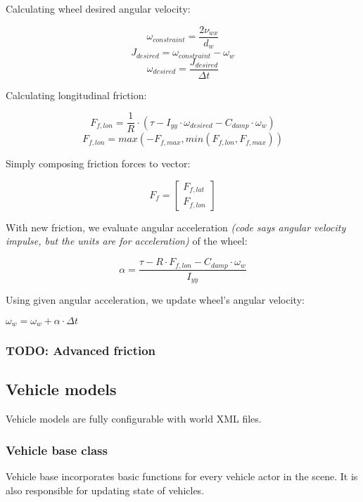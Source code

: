 \documentclass[a4paper,11pt]{article}
\begin{document}
Calculating wheel desired angular velocity:

\begin{center}
\[
\omega_{constraint} = \frac{2\nu_{wx}}{d_w}
\]
\[
J_{desired} = \omega_{constraint} - \omega_w
\]
\[
\omega_{desired} = \frac{J_{desired}}{\Delta t}
\]
\end{center}


Calculating longitudinal friction:
\begin{center}
\[
F_{f,lon} = \frac{1}{R} \cdot (\tau - I_{yy}\cdot \omega_{desired} - C_{damp} \cdot \omega_w)
\]
\[
F_{f,lon} = max(-F_{f,max}, min(F_{f,lon}, F_{f,max}))
\]
\end{center}

Simply composing friction forces to vector:
\begin{center}
\[
F_f = 
\begin{bmatrix}
F_{f,lat} \\
F_{f,lon}
\end{bmatrix}
\]
\end{center}

With new friction, we evaluate angular acceleration \textit{(code says angular velocity impulse, but the units are for acceleration)}  of the wheel:
\begin{center}
\[
\alpha = \frac{ \tau - R \cdot F_{f,lon} - C_{damp} \cdot \omega_w}{I_{yy}}
\]
\end{center}

Using given angular acceleration, we update wheel's angular velocity:
\begin{center}
$
\omega_w = \omega_w + \alpha \cdot \Delta t
$
\end{center}

\newpage
\subsubsection{TODO: Advanced friction}
\newpage

\subsection{Vehicle models}

Vehicle models are fully configurable with world XML files. 

\subsubsection{Vehicle base class}

Vehicle base incorporates basic functions for every vehicle actor in the scene. It is also responsible for updating state of vehicles.
\end{document}
